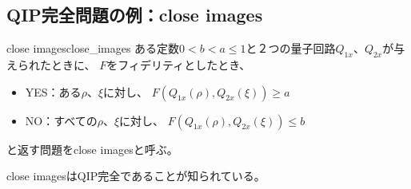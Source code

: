 \documentclass[a4paper, 10pt]{jsarticle}
\begin{document}
\subsection{QIP完全問題の例：close images}
\begin{dfn}{close images}{close_images}
	ある定数$0 < b < a \leq 1$と２つの量子回路$Q_{1x}$、$Q_{2x}$が与えられたときに、
	$F$をフィデリティとしたとき、
	\begin{itemize}
		\item YES：ある$\rho$、$\xi$に対し、
		$F(Q_{1x}(\rho), Q_{2x}(\xi)) \geq a$
		\item NO：すべての$\rho$、$\xi$に対し、
		$F(Q_{1x}(\rho), Q_{2x}(\xi)) \leq b$
	\end{itemize}
	と返す問題をclose imagesと呼ぶ。
\end{dfn}
close imagesはQIP完全であることが知られている。
\end{document}
